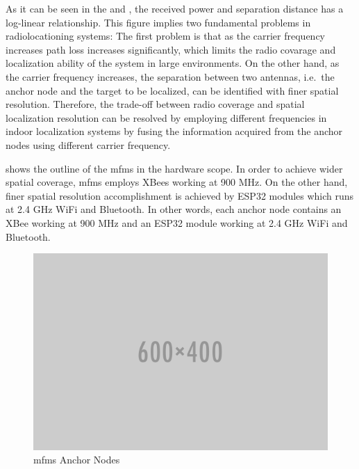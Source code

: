     As it can be seen in the  and , the received power and separation distance has a log-linear relationship.
    This figure implies two fundamental problems in radiolocationing systems:
    The first problem is that as the carrier frequency increases path loss increases significantly, which limits the radio covarage and localization ability of the system in large environments.
    On the other hand, as the carrier frequency increases, the separation between two antennas, i.e.\ the anchor node and the target to be localized, can be identified with finer spatial resolution.
    Therefore, the trade-off between radio coverage and spatial localization resolution can be resolved by employing different frequencies in indoor localization systems by fusing the information acquired from the anchor nodes using different carrier frequency.

     shows the outline of the \gls{mfms} in the hardware scope.
    In order to achieve wider spatial coverage, \gls{mfms} employs XBees working at 900 MHz.
    On the other hand, finer spatial resolution accomplishment is achieved by ESP32 modules which runs at 2.4 GHz WiFi and Bluetooth.
    In other words, each anchor node contains an XBee working at 900 MHz and an ESP32 module working at 2.4 GHz WiFi and Bluetooth.

    \begin{figure}[thpb]
       \centering
       \includegraphics[width=\linewidth]{figures/placeholder.png}
       \caption{\label{fig:module}\gls{mfms} Anchor Nodes}
    \end{figure}

